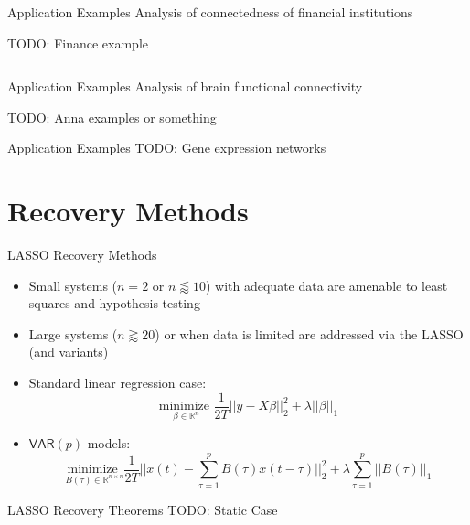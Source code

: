 \documentclass{beamer} %
\def\VAR{\mathsf{VAR}}  %
\def\R{\mathbb{R}}  %
\begin{document}
\begin{frame}{Application Examples}
  Analysis of connectedness of financial institutions

  TODO: Finance example
  \begin{columns}

  \end{columns}

\end{frame}

\begin{frame}{Application Examples}
  Analysis of brain functional connectivity
  
  TODO: Anna examples or something
\end{frame}

\begin{frame}{Application Examples}
  TODO: Gene expression networks
\end{frame}

\section{Recovery Methods}
\begin{frame}{LASSO Recovery Methods}
  \begin{itemize}
    \item{Small systems ($n = 2$ or $n \lessapprox 10$) with adequate data are amenable to least squares and hypothesis testing}\pause
    \item{Large systems ($n \gtrapprox 20$) or when data is limited are addressed via the LASSO (and variants)}\pause
    \item{Standard linear regression case:
        \begin{equation*}
          \underset{\beta \in \R^n}{\text{minimize }} \frac{1}{2T}||y - X\beta||_2^2 + \lambda ||\beta||_1
        \end{equation*}
      }\pause
    \item{$\VAR(p)$ models:
        \begin{equation*}
          \underset{B(\tau) \in \R^{n \times n}}{\text{minimize }} \frac{1}{2T}||x(t) - \sum_{\tau = 1}^p B(\tau)x(t - \tau)||_2^2 + \lambda \sum_{\tau = 1}^p ||B(\tau)||_1
        \end{equation*}
      }
  \end{itemize}
\end{frame}

\begin{frame}{LASSO Recovery Theorems}
  TODO: Static Case
\end{frame}
\end{document}
